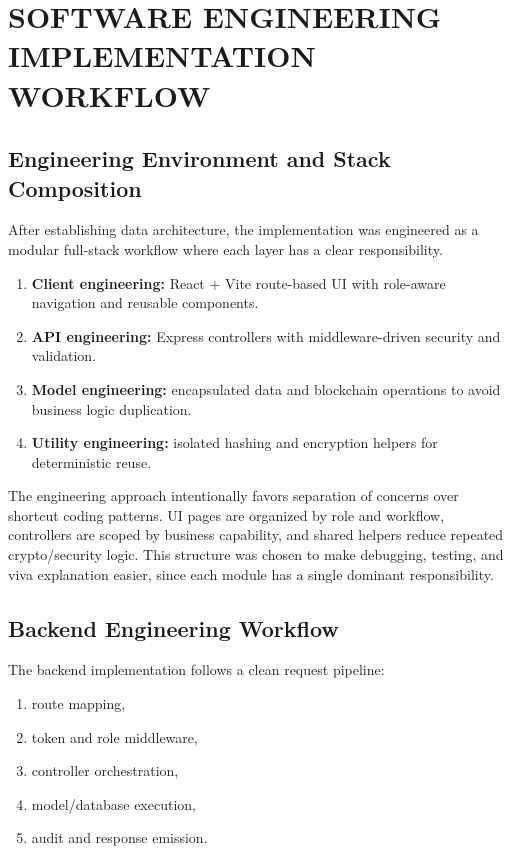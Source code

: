 \documentclass[12pt,a4paper]{report}
\begin{document}
\chapter{SOFTWARE ENGINEERING IMPLEMENTATION WORKFLOW}

\section{Engineering Environment and Stack Composition}

After establishing data architecture, the implementation was engineered as a modular full-stack workflow where each layer has a clear responsibility.

\begin{enumerate}
\item \textbf{Client engineering:} React + Vite route-based UI with role-aware navigation and reusable components.
\item \textbf{API engineering:} Express controllers with middleware-driven security and validation.
\item \textbf{Model engineering:} encapsulated data and blockchain operations to avoid business logic duplication.
\item \textbf{Utility engineering:} isolated hashing and encryption helpers for deterministic reuse.
\end{enumerate}

The engineering approach intentionally favors separation of concerns over shortcut coding patterns. UI pages are organized by role and workflow, controllers are scoped by business capability, and shared helpers reduce repeated crypto/security logic. This structure was chosen to make debugging, testing, and viva explanation easier, since each module has a single dominant responsibility.

\section{Backend Engineering Workflow}

The backend implementation follows a clean request pipeline:

\begin{enumerate}
\item route mapping,
\item token and role middleware,
\item controller orchestration,
\item model/database execution,
\item audit and response emission.
\end{enumerate}
\end{document}
